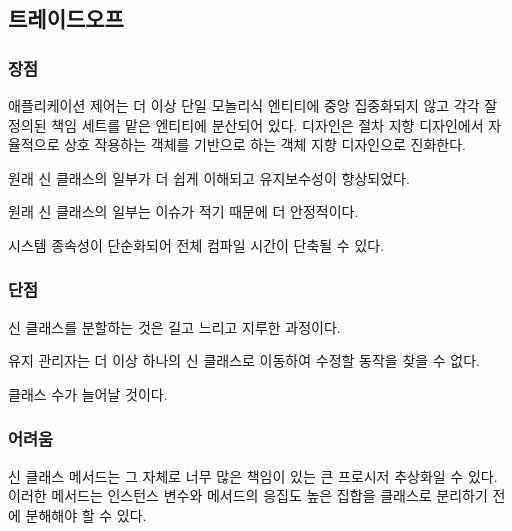 \documentclass[a4paper,10pt,twoside]{book}
\begin{document}
\subsection*{트레이드오프}

\subsubsection*{장점}

\begin{bulletlist}
\item 애플리케이션 제어는 더 이상 단일 모놀리식 엔티티에 중앙 집중화되지 않고 각각 잘 정의된 책임 세트를 맡은 엔티티에 분산되어 있다. 디자인은 절차 지향 디자인에서 자율적으로 상호 작용하는 객체를 기반으로 하는 객체 지향 디자인으로 진화한다.

\item 원래 신 클래스의 일부가 더 쉽게 이해되고 유지보수성이 향상되었다.

\item 원래 신 클래스의 일부는 이슈가 적기 때문에 더 안정적이다. 

\item 시스템 종속성이 단순화되어 전체 컴파일 시간이 단축될 수 있다.
\end{bulletlist}

\subsubsection*{단점}

\begin{bulletlist}
\item 신 클래스를 분할하는 것은 길고 느리고 지루한 과정이다.

\item 유지 관리자는 더 이상 하나의 신 클래스로 이동하여 수정할 동작을 찾을 수 없다.

\item 클래스 수가 늘어날 것이다.
\end{bulletlist}

\subsubsection*{어려움}

\begin{bulletlist}
	\item 신 클래스 메서드는 그 자체로 너무 많은 책임이 있는 큰 프로시저 추상화일 수 있다. 이러한 메서드는 인스턴스 변수와 메서드의 응집도 높은 집합을 클래스로 분리하기 전에 분해해야 할 수 있다.
\end{bulletlist}
\end{document}
